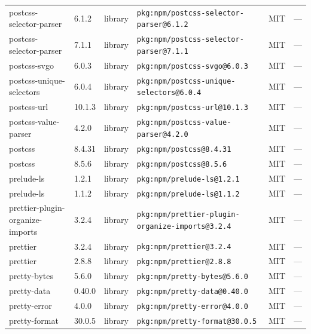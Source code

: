 \documentclass[11pt,a4paper]{article}
\begin{document}
\begin{longtable}{|p{4cm}|p{2cm}|p{1.6cm}|p{5cm}|p{1.5cm}|p{3.5cm}|}
\raggedright postcss-selector-parser & 6.1.2 & library & \small\texttt{pkg:npm/postcss-selector-parser@6.1.2} & MIT & \small — \\
\raggedright postcss-selector-parser & 7.1.1 & library & \small\texttt{pkg:npm/postcss-selector-parser@7.1.1} & MIT & \small — \\
\raggedright postcss-svgo & 6.0.3 & library & \small\texttt{pkg:npm/postcss-svgo@6.0.3} & MIT & \small — \\
\raggedright postcss-unique-selectors & 6.0.4 & library & \small\texttt{pkg:npm/postcss-unique-selectors@6.0.4} & MIT & \small — \\
\raggedright postcss-url & 10.1.3 & library & \small\texttt{pkg:npm/postcss-url@10.1.3} & MIT & \small — \\
\raggedright postcss-value-parser & 4.2.0 & library & \small\texttt{pkg:npm/postcss-value-parser@4.2.0} & MIT & \small — \\
\raggedright postcss & 8.4.31 & library & \small\texttt{pkg:npm/postcss@8.4.31} & MIT & \small — \\
\raggedright postcss & 8.5.6 & library & \small\texttt{pkg:npm/postcss@8.5.6} & MIT & \small — \\
\raggedright prelude-ls & 1.2.1 & library & \small\texttt{pkg:npm/prelude-ls@1.2.1} & MIT & \small — \\
\raggedright prelude-ls & 1.1.2 & library & \small\texttt{pkg:npm/prelude-ls@1.1.2} & MIT & \small — \\
\raggedright prettier-plugin-organize-imports & 3.2.4 & library & \small\texttt{pkg:npm/prettier-plugin-organize-imports@3.2.4} & MIT & \small — \\
\raggedright prettier & 3.2.4 & library & \small\texttt{pkg:npm/prettier@3.2.4} & MIT & \small — \\
\raggedright prettier & 2.8.8 & library & \small\texttt{pkg:npm/prettier@2.8.8} & MIT & \small — \\
\raggedright pretty-bytes & 5.6.0 & library & \small\texttt{pkg:npm/pretty-bytes@5.6.0} & MIT & \small — \\
\raggedright pretty-data & 0.40.0 & library & \small\texttt{pkg:npm/pretty-data@0.40.0} & MIT & \small — \\
\raggedright pretty-error & 4.0.0 & library & \small\texttt{pkg:npm/pretty-error@4.0.0} & MIT & \small — \\
\raggedright pretty-format & 30.0.5 & library & \small\texttt{pkg:npm/pretty-format@30.0.5} & MIT & \small — \\

\end{longtable}
\end{document}
